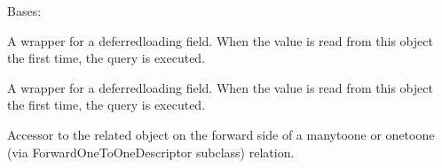 \documentclass[letterpaper,10pt,english]{sphinxmanual}
\begin{document}
\begin{fulllineitems}

\begin{fulllineitems}
\label{\detokenize{courses:courses.models.LessonCompletion.MultipleObjectsReturned}}
\pysigstartsignatures
\pysigline
{}
\pysigstopsignatures
\sphinxAtStartPar
Bases: 

\end{fulllineitems}


\begin{fulllineitems}
\label{\detokenize{courses:id13}}
\pysigstartsignatures
\pysigline
{}
\pysigstopsignatures
\sphinxAtStartPar
A wrapper for a deferred\sphinxhyphen{}loading field. When the value is read from this
object the first time, the query is executed.

\end{fulllineitems}


\begin{fulllineitems}
\label{\detokenize{courses:courses.models.LessonCompletion.created_at}}
\pysigstartsignatures
\pysigline
{}
\pysigstopsignatures
\sphinxAtStartPar
A wrapper for a deferred\sphinxhyphen{}loading field. When the value is read from this
object the first time, the query is executed.

\end{fulllineitems}


\begin{fulllineitems}
\label{\detokenize{courses:courses.models.LessonCompletion.created_by}}
\pysigstartsignatures
\pysigline
{}
\pysigstopsignatures
\sphinxAtStartPar
Accessor to the related object on the forward side of a many\sphinxhyphen{}to\sphinxhyphen{}one or
one\sphinxhyphen{}to\sphinxhyphen{}one (via ForwardOneToOneDescriptor subclass) relation.


\end{fulllineitems}
\end{fulllineitems}
\end{document}
